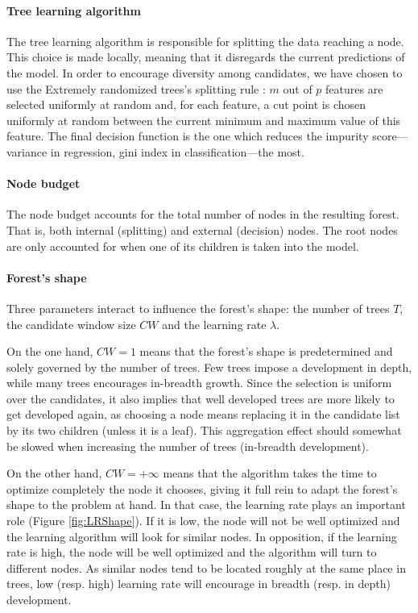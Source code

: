 \documentclass{article}
\begin{document}
\paragraph{Tree learning algorithm}
The tree learning algorithm is responsible for splitting the data reaching a 
node. This choice is made locally, meaning that it disregards the current 
predictions of the model. In order to encourage diversity among candidates, we 
have chosen to use the Extremely randomized trees's splitting rule 
\cite{extratrees}: $m$ out of $p$ features are selected uniformly at random 
and, for each feature, a cut point is chosen uniformly at random between the 
current minimum and maximum value of this feature. The final decision function 
is the one which reduces the impurity score---variance in regression, gini 
index in classification---the most.

\paragraph{Node budget}
The node budget accounts for the total number of nodes in the resulting forest. 
That is, both internal (splitting) and external (decision) nodes. The root 
nodes are only accounted for when one of its children is taken into the model.

\paragraph{Forest's shape}
Three parameters interact to influence the forest's shape: the number of trees 
$T$, the candidate window size $CW$ and the learning rate $\lambda$. 

On the one hand, $CW=1$ means that the forest's shape is predetermined and 
solely governed by the number of trees. Few trees impose a development in 
depth, while many trees encourages in-breadth growth. Since the selection 
is uniform over the candidates, it also implies that well developed trees are 
more likely to get developed again, as choosing a node means replacing it in 
the candidate list by its two children (unless it is a leaf). This aggregation 
effect should somewhat be slowed when increasing the number of trees 
(in-breadth development).

On the other hand, $CW=+\infty$ means that the algorithm takes the 
time to optimize completely the node it chooses, giving it full rein to adapt 
the forest's shape to the problem at hand. In that case, the learning rate 
plays an important role (Figure \ref{fig:LRShape}). If it is low, the node will 
not be well optimized and the learning algorithm will look for similar nodes. 
In opposition, if the learning rate is high, the node will be well optimized 
and the algorithm will turn to different nodes.
As similar nodes tend to be located roughly at the same place in trees, low 
(resp. high) learning rate will encourage in breadth (resp. in depth) 
development.
\end{document}
